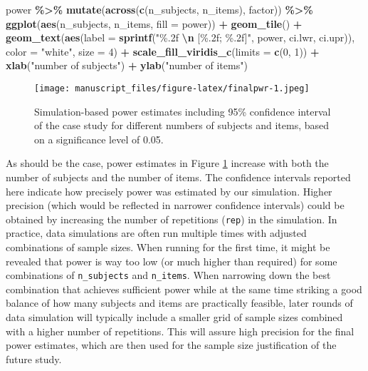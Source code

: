 \documentclass[
  man,floatsintext]{apa6}
\newenvironment{Shaded}{\begin{snugshade}}{\end{snugshade}}
\newcommand{\AttributeTok}[1]{\textcolor[rgb]{0.13,0.29,0.53}{#1}}
\newcommand{\DecValTok}[1]{\textcolor[rgb]{0.00,0.00,0.81}{#1}}
\newcommand{\FunctionTok}[1]{\textcolor[rgb]{0.13,0.29,0.53}{\textbf{#1}}}
\newcommand{\NormalTok}[1]{#1}
\newcommand{\SpecialCharTok}[1]{\textcolor[rgb]{0.81,0.36,0.00}{\textbf{#1}}}
\newcommand{\StringTok}[1]{\textcolor[rgb]{0.31,0.60,0.02}{#1}}
\begin{document}
\begin{Shaded}
\begin{Highlighting}[]
\NormalTok{power }\SpecialCharTok{\%\textgreater{}\%}
  \FunctionTok{mutate}\NormalTok{(}\FunctionTok{across}\NormalTok{(}\FunctionTok{c}\NormalTok{(n\_subjects, n\_items), factor)) }\SpecialCharTok{\%\textgreater{}\%}
  \FunctionTok{ggplot}\NormalTok{(}\FunctionTok{aes}\NormalTok{(n\_subjects, n\_items, }\AttributeTok{fill =}\NormalTok{ power)) }\SpecialCharTok{+}
  \FunctionTok{geom\_tile}\NormalTok{() }\SpecialCharTok{+}
  \FunctionTok{geom\_text}\NormalTok{(}\FunctionTok{aes}\NormalTok{(}\AttributeTok{label =} \FunctionTok{sprintf}\NormalTok{(}\StringTok{"\%.2f }\SpecialCharTok{\textbackslash{}n}\StringTok{ [\%.2f; \%.2f]"}\NormalTok{, }
\NormalTok{                                power, ci.lwr, ci.upr)), }
    \AttributeTok{color =} \StringTok{"white"}\NormalTok{, }\AttributeTok{size =} \DecValTok{4}\NormalTok{) }\SpecialCharTok{+}
  \FunctionTok{scale\_fill\_viridis\_c}\NormalTok{(}\AttributeTok{limits =} \FunctionTok{c}\NormalTok{(}\DecValTok{0}\NormalTok{, }\DecValTok{1}\NormalTok{)) }\SpecialCharTok{+}
  \FunctionTok{xlab}\NormalTok{(}\StringTok{"number of subjects"}\NormalTok{) }\SpecialCharTok{+} \FunctionTok{ylab}\NormalTok{(}\StringTok{"number of items"}\NormalTok{)}
\end{Highlighting}
\end{Shaded}

\begin{figure}
\centering
\texttt{[image: manuscript\_files/figure-latex/finalpwr-1.jpeg]}
\caption{\label{fig:finalpwr}Simulation-based power estimates including 95\% confidence interval of the case study for different numbers of subjects and items, based on a significance level of 0.05.}
\end{figure}

As should be the case, power estimates in Figure \ref{fig:finalpwr} increase with both the number of subjects and the number of items. The confidence intervals reported here indicate how precisely power was estimated by our simulation. Higher precision (which would be reflected in narrower confidence intervals) could be obtained by increasing the number of repetitions (\texttt{rep}) in the simulation. In practice, data simulations are often run multiple times with adjusted combinations of sample sizes. When running for the first time, it might be revealed that power is way too low (or much higher than required) for some combinations of \texttt{n\_subjects} and \texttt{n\_items}. When narrowing down the best combination that achieves sufficient power while at the same time striking a good balance of how many subjects and items are practically feasible, later rounds of data simulation will typically include a smaller grid of sample sizes combined with a higher number of repetitions. This will assure high precision for the final power estimates, which are then used for the sample size justification of the future study.
\end{document}
